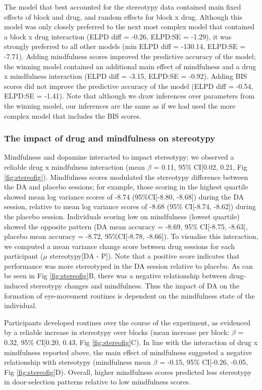 \documentclass{article}
\begin{document}
The model that best accounted for the stereotypy data contained main
fixed effects of block and drug, and random effects for block x drug.
Although this model was only closely preferred to the next most complex
model that contained a block x drug interaction (ELPD diff = -0.26,
ELPD:SE = -1.29), it was strongly preferred to all other models (min
ELPD diff = -130.14, ELPD:SE = -7.71). Adding mindfulness scores
improved the predictive accuracy of the model; the winning model
contained an additional main effect of mindfulness and a drug x
mindfulness interaction (ELPD diff = -3.15, ELPD:SE = -0.92). Adding BIS
scores did not improve the predictive accuracy of the model (ELPD diff =
-0.54, ELPD:SE = -1.41). Note that although we draw inferences over
parameters from the winning model, our inferences are the same as if we
had used the more complex model that includes the BIS scores.

\hypertarget{the-impact-of-drug-and-mindfulness-on-stereotypy}{%
\subsubsection{The impact of drug and mindfulness on
stereotypy}\label{the-impact-of-drug-and-mindfulness-on-stereotypy}}

Mindfulness and dopamine interacted to impact stereotypy; we observed a
reliable drug x mindfulness interaction (mean \(\beta\) = 0.11, 95\%
CI{[}0.02, 0.21, Fig \ref{fig:stereofig}). Mindfulness scores modulated
the stereotypy difference between the DA and placebo sessions; for
example, those scoring in the highest quartile showed mean log variance
scores of -8.74 (95\%CI{[}-8.80, -8.68{]}) during the DA session,
relative to mean log variance scores of -8.68 (95\% CI{[}-8.74,
-8.62{]}) during the placebo session. Individuals scoring low on
mindfulness (lowest quartile) showed the opposite pattern (DA mean
accuracy = -8.69, 95\% CI{[}-8.75, -8.63{]}, placebo mean accuracy =
-8.72, 95\%CI{[}-8.78, -8.66{]}). To visualise this interaction, we
computed a mean variance change score between drug sessions for each
participant (\(\mu\) stereotypy{[}DA - P{]}). Note that a positive score
indicates that performance was more stereotyped in the DA session
relative to placebo. As can be seen in Fig \ref{fig:stereofig}B, there
was a negative relationship between drug-induced stereotypy changes and
mindfulness. Thus the impact of DA on the formation of eye-movement
routines is dependent on the mindfulness state of the individual.

Participants developed routines over the course of the experiment, as
evidenced by a reliable increase in stereotypy over blocks (mean
increase per block: \(\beta\) = 0.32, 95\% CI{[}0.20, 0.43, Fig
\ref{fig:stereofig}C). In line with the interaction of drug x
mindfulness reported above, the main effect of mindfulness suggested a
negative relationship with stereotypy (mindfulness mean \(\beta\) =
-0.15, 95\% CI{[}-0.26, -0.05, Fig \ref{fig:stereofig}D). Overall,
higher mindfulness scores predicted less stereotypy in door-selection
patterns relative to low mindfulness scores.
\end{document}
